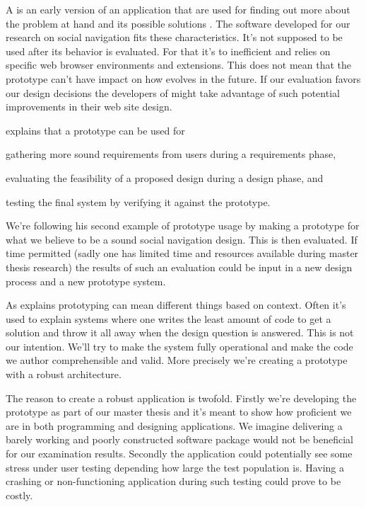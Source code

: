 A  is an early version of an application that are used for
finding out more about the problem at hand and its possible solutions
\citep[]{sommerville06}.
The software developed for our research on social navigation fits these
characteristics. It's not supposed to be used after its behavior is
evaluated. For that it's to inefficient and relies on specific web browser
environments and extensions. This does not mean that the prototype can't have
impact on how \urort{} evolves in the future. If our evaluation favors our
design decisions the developers of \urort{} might take advantage of such
potential improvements in their web site design.

\citet[]{sommerville06} explains that a prototype can be used for
\begin{inparaenum}[(i)]
  \item gathering more sound requirements from users during a
    requirements phase,
  \item evaluating the feasibility of a proposed design during a
    design phase, and
  \item testing the final system by verifying it against the prototype.
\end{inparaenum}
We're following his second example of prototype usage by making a prototype
for what we believe to be a sound social navigation design. This is then
evaluated. If time permitted (sadly one has limited time and resources
available during master thesis research) the results of such an evaluation
could be input in a new design process and a new prototype system.

As \citet[]{mcconnell04} explains prototyping can mean different things
based on context. Often it's used to explain systems where one writes the
least amount of code to get a solution and throw it all away when the design
question is answered. This is not our intention. We'll try to make the system
fully operational and make the code we author comprehensible and
valid. More precisely we're creating a  prototype
\cite[]{rudd96} with a robust architecture.

The reason to create a robust application is twofold. Firstly we're developing
the prototype as part of our master thesis and it's meant to show how
proficient we are in both programming and designing applications. We
imagine delivering a barely working and poorly constructed software package
would not be beneficial for our examination results.
Secondly the application could potentially see some stress under user testing
depending how large the test population is. Having a crashing or
non-functioning application during such testing could prove to be costly.

